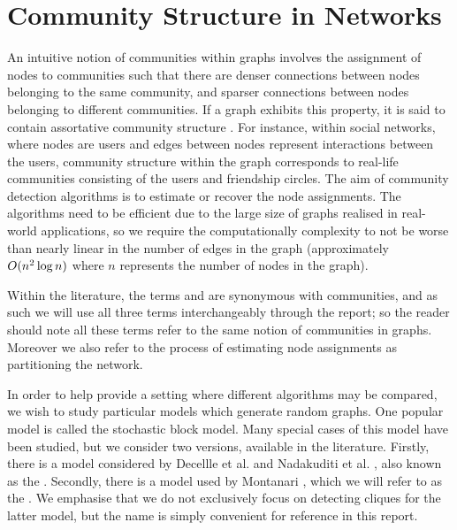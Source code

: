 
\section{Community Structure in Networks}
\label{sec:communityStructureBackground}

An intuitive notion of communities within graphs involves the assignment of nodes to communities such that there are denser connections between nodes belonging to the same community, and sparser connections between nodes belonging to different communities.
If a graph exhibits this property, it is said to contain assortative community structure \cite{New06a,DKM+13,For10,New06b}.
For instance, within social networks, where nodes are users and edges between nodes represent interactions between the users, community structure within the graph corresponds to real-life communities consisting of the users and friendship circles.
The aim of community detection algorithms is to estimate or recover the node assignments.
The algorithms need to be efficient due to the large size of graphs realised in real-world applications, so we require the computationally complexity to not be worse than nearly linear in the number of edges in the graph (approximately $O(n^{2}\log n)$ where $n$ represents the number of nodes in the graph).

Within the literature, the terms  and  are synonymous with communities, and as such we will use all three terms interchangeably through the report; so the reader should note all these terms refer to the same notion of communities in graphs.
Moreover we also refer to the process of estimating node assignments as partitioning the network.

In order to help provide a setting where different algorithms may be compared, we wish to study particular models which generate random graphs.
One popular model is called the stochastic block model.
Many special cases of this model have been studied, but we consider two versions, available in the literature.
Firstly, there is a model considered by Decellle et al. \cite{DKM+13} and Nadakuditi et al. \cite{NN12}, also known as the .
Secondly, there is a model used by Montanari \cite{DM13,Mon13}, which we will refer to as the . 
We emphasise that we do not exclusively focus on detecting cliques for the latter model, but the name is simply convenient for reference in this report.

